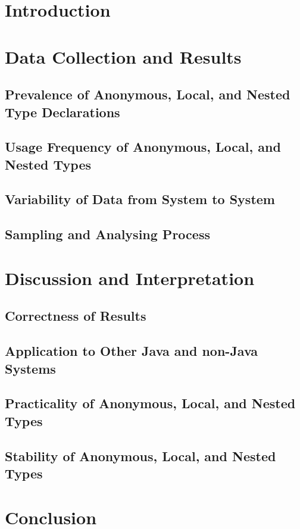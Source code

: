 \documentclass[12p]{article}
\begin{document}
\section{Introduction}
\section{Data Collection and Results}
\subsection{Prevalence of Anonymous, Local, and Nested Type Declarations}
\subsection{Usage Frequency of Anonymous, Local, and Nested Types}
\subsection{Variability of Data from System to System}
\subsection{Sampling and Analysing Process}


\section{Discussion and Interpretation}

\subsection{Correctness of Results}
\subsection{Application to Other Java and non-Java Systems}

\subsection{Practicality of Anonymous, Local, and Nested Types}
\subsection{Stability of Anonymous, Local, and Nested Types}


\section{Conclusion}
\end{document}
